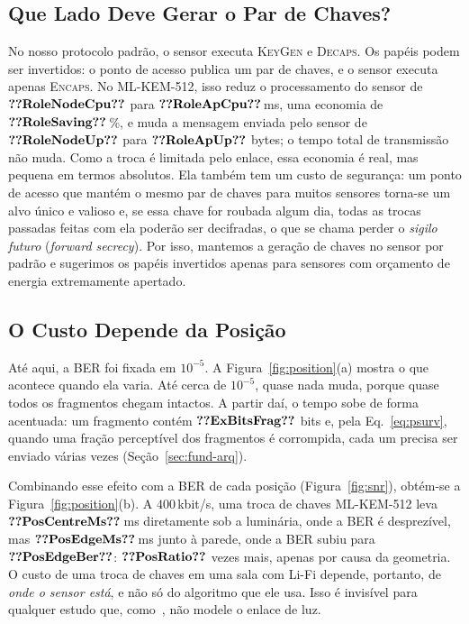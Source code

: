 \documentclass[12pt]{article}
\begin{document}
\subsection{Que Lado Deve Gerar o Par de Chaves?}\label{sec:roles}
No nosso protocolo padrão, o sensor executa \textsc{KeyGen} e \textsc{Decaps}.
Os papéis podem ser invertidos: o ponto de acesso publica um par de chaves, e o
sensor executa apenas \textsc{Encaps}. No ML-KEM-512, isso reduz o
processamento do sensor de $\val{RoleNodeCpu}$ para $\val{RoleApCpu}$\,ms, uma
economia de $\val{RoleSaving}$\,\%, e muda a mensagem enviada pelo sensor de
$\val{RoleNodeUp}$ para $\val{RoleApUp}$ bytes; o tempo total de transmissão
não muda. Como a troca é limitada pelo enlace, essa economia é real, mas
pequena em termos absolutos. Ela também tem um custo de segurança: um ponto de
acesso que mantém o mesmo par de chaves para muitos sensores torna-se um alvo
único e valioso e, se essa chave for roubada algum dia, todas as trocas
passadas feitas com ela poderão ser decifradas, o que se chama perder o
\emph{sigilo futuro} (\emph{forward secrecy}). Por isso, mantemos a geração de
chaves no sensor por padrão e sugerimos os papéis invertidos apenas para
sensores com orçamento de energia extremamente apertado.

\subsection{O Custo Depende da Posição}\label{sec:position}
Até aqui, a BER foi fixada em $10^{-5}$. A Figura~\ref{fig:position}(a) mostra o
que acontece quando ela varia. Até cerca de $10^{-5}$, quase nada muda, porque
quase todos os fragmentos chegam intactos. A partir daí, o tempo sobe de forma
acentuada: um fragmento contém $\val{ExBitsFrag}$ bits e, pela
Eq.~\eqref{eq:psurv}, quando uma fração perceptível dos fragmentos é
corrompida, cada um precisa ser enviado várias vezes
(Seção~\ref{sec:fund-arq}).



Combinando esse efeito com a BER de cada posição (Figura~\ref{fig:snr}),
obtém-se a Figura~\ref{fig:position}(b). A $400$\,kbit/s, uma troca de chaves
ML-KEM-512 leva $\val{PosCentreMs}$\,ms diretamente sob a luminária, onde a BER
é desprezível, mas $\val{PosEdgeMs}$\,ms junto à parede, onde a BER subiu para
$\val{PosEdgeBer}$: $\val{PosRatio}$ vezes mais, apenas por causa da geometria.
O custo de uma troca de chaves em uma sala com Li-Fi depende, portanto, de
\emph{onde o sensor está}, e não só do algoritmo que ele usa. Isso é invisível
para qualquer estudo que, como~\cite{nurmurodov2025esp32}, não modele o enlace
de luz.
\end{document}

